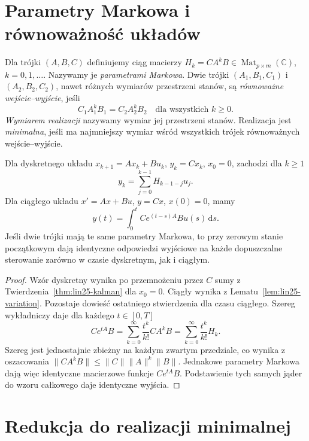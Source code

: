 \section{Parametry Markowa i równoważność układów}
\label{sec:lin27-markov}

\begin{definicja}
\label{def:lin27-markov}
Dla trójki \((A,B,C)\)
definiujemy ciąg macierzy
\(H_k=CA^kB\in
\operatorname{Mat}_{p\times m}(\mathbb C)\),
\(k=0,1,\ldots\).
Nazywamy je
\emph{parametrami Markowa}.
Dwie trójki
\((A_1,B_1,C_1)\)
i \((A_2,B_2,C_2)\),
nawet różnych wymiarów
przestrzeni stanów,
są \emph{równoważne
wejście--wyjście}, jeśli
\[
 C_1A_1^kB_1=C_2A_2^kB_2
 \quad\text{dla wszystkich }k\ge0.
\]
\emph{Wymiarem realizacji}
nazywamy wymiar jej
przestrzeni stanów.
Realizacja jest
\emph{minimalna}, jeśli
ma najmniejszy wymiar
wśród wszystkich trójek
równoważnych wejście--wyjście.
\end{definicja}

\begin{lemat}
\label{lem:lin27-markov-output}
Dla dyskretnego układu
\(x_{k+1}=Ax_k+Bu_k\),
\(y_k=Cx_k\), \(x_0=0\),
zachodzi dla \(k\ge1\)
\[
 y_k=\sum_{j=0}^{k-1}
         H_{k-1-j}u_j.
\]
Dla ciągłego układu
\(x'=Ax+Bu\), \(y=Cx\),
\(x(0)=0\), mamy
\[
 y(t)=\int_0^t
          Ce^{(t-s)A}Bu(s)
          \,\mathrm ds.
\]
Jeśli dwie trójki
mają te same parametry Markowa,
to przy zerowym stanie początkowym
dają identyczne odpowiedzi
wyjściowe na każde dopuszczalne
sterowanie zarówno w czasie
dyskretnym, jak i ciągłym.
\end{lemat}
\begin{proof}
Wzór dyskretny wynika
po przemnożeniu przez \(C\)
sumy z
Twierdzenia~\ref{thm:lin25-kalman}
dla \(x_0=0\).
Ciągły wynika
z
Lematu~\ref{lem:lin25-variation}.
Pozostaje dowieść
ostatniego stwierdzenia
dla czasu ciągłego.
Szereg wykładniczy
daje dla każdego
\(t\in[0,T]\)
\[
 Ce^{tA}B
 =\sum_{k=0}^\infty
     \frac{t^k}{k!}CA^kB
 =\sum_{k=0}^\infty
     \frac{t^k}{k!}H_k.
\]
Szereg jest jednostajnie
zbieżny na każdym
zwartym przedziale,
co wynika z oszacowania
\(\|CA^kB\|
 \le\|C\|\|A\|^k\|B\|\).
Jednakowe parametry Markowa
dają więc identyczne macierzowe
funkcje \(Ce^{tA}B\).
Podstawienie tych samych
jąder do wzoru całkowego
daje identyczne wyjścia.
\end{proof}

\section{Redukcja do realizacji minimalnej}
\label{sec:lin27-minimal}

